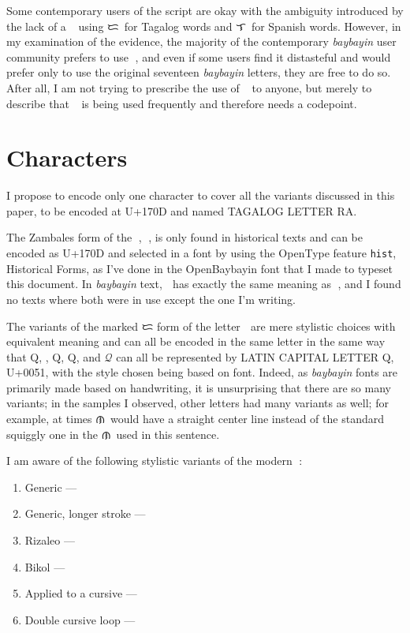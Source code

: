 \documentclass[a4paper,pagesize,openany,14pt,parskip=never]{scrbook}
\newcommand{\≈}{$\approx$}
\newcommand{\la}{{\baybayin ᜎ}}
\newcommand{\da}{{\baybayin ᜇ}}
\newcommand{\ra}{{\baybayin ᜍ}}
\newcommand{\na}{{\baybayin ᜈ}}
\newcommand{\rizaleoRA}{{\baybayinb \symbol{"E005}}}
\newcommand{\cochinQ}{{\cochin Q}}
\begin{document}
Some contemporary users of the script are okay with the ambiguity introduced by the lack of a \ra\, using \da\ for Tagalog words and \la\ for Spanish words. However, in my examination of the evidence, the majority of the contemporary {\em baybayin} user community prefers to use \ra, and even if some users find it distasteful and would prefer only to use the original seventeen {\em baybayin} letters, they are free to do so. After all, I am not trying to prescribe the use of \ra\ to anyone, but merely to describe that \ra\ is being used frequently and therefore needs a codepoint.

\section{Characters}
I propose to encode only one character to cover all the variants discussed in this paper, to be encoded at U+170D and named \textsf{TAGALOG LETTER RA}. 

The Zambales form of the {\baybayin ᜍ}, {\baybayinh ᜍ}, is only found in historical texts and can be encoded as U+170D and selected in a font by using the OpenType feature \texttt{hist}, \textsf{Historical Forms}, as I've done in the OpenBaybayin font that I made to typeset this document. In {\em baybayin} text, {\baybayinh ᜍ} has exactly the same meaning as {\baybayin ᜍ}, and I found no texts where both were in use except the one I'm writing.

The variants of the marked {\baybayin ᜇ} form of the letter {\baybayin ᜍ} are mere stylistic choices with equivalent meaning and can all be encoded in the same letter in the same way that Q, {}, \textsf{Q}, \cochinQ, and $\mathscr{Q}$ can all be represented by \textsf{LATIN CAPITAL LETTER Q}, U+0051, with the style chosen being based on font. Indeed, as {\em baybayin} fonts are primarily made based on handwriting, it is unsurprising that there are so many variants; in the samples I observed, other letters had many variants as well; for example, at times \na\ would have a straight center line instead of the standard squiggly one in the \na\ used in this sentence.

I am aware of the following stylistic variants of the modern \ra:

\begin{enumerate}
    \item Generic --- \ra
    \item Generic, longer stroke --- {\baybayinb {}}
    \item Rizaleo --- \rizaleoRA
    \item Bikol --- {\baybayinb {}}
    \item Applied to a cursive {\baybayinb {}} --- {\baybayinb {}}
    \item\label{DoubleLoop} Double cursive loop --- {\baybayinb {}}
\end{enumerate}
\end{document}
